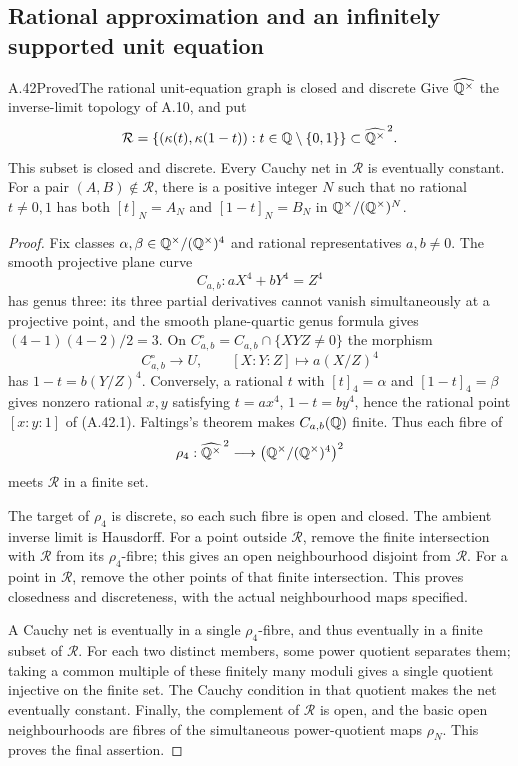 \subsection{Rational approximation and an infinitely supported unit equation}

\begin{statement}{A.42}{Proved}{The rational unit-equation graph is closed and discrete}
Give $\widehat{\mathbb Q^\times}$ the inverse-limit topology of A.10,
and put
\[
 \mathcal R=
 \{(\kappa(t),\kappa(1-t)):t\in\mathbb Q\setminus\{0,1\}\}
       \subset\widehat{\mathbb Q^\times}^{\,2}.
\]
This subset is closed and discrete. Every Cauchy net in
$\mathcal R$ is eventually constant. For a pair
$(A,B)\notin\mathcal R$, there is a positive integer $N$
such that no rational $t\ne0,1$ has both
$[t]_N=A_N$ and $[1-t]_N=B_N$ in
$\mathbb Q^\times/(\mathbb Q^\times)^N$.
\end{statement}
\begin{proof}
Fix classes $\alpha,\beta\in\mathbb Q^\times/(\mathbb Q^\times)^4$
and rational representatives $a,b\ne0$. The smooth projective
plane curve
\[
 C_{a,b}:aX^4+bY^4=Z^4
 \tag{A.42.1}
\]
has genus three: its three partial derivatives cannot vanish
simultaneously at a projective point, and the smooth
plane-quartic genus formula gives $(4-1)(4-2)/2=3$.
On $C_{a,b}^{\circ}=C_{a,b}\cap\{XYZ\ne0\}$ the morphism
\[
 C_{a,b}^{\circ}\longrightarrow U,
 \qquad [X:Y:Z]\longmapsto a(X/Z)^4
 \tag{A.42.2}
\]
has $1-t=b(Y/Z)^4$. Conversely, a rational $t$ with
$[t]_4=\alpha$ and $[1-t]_4=\beta$ gives nonzero rational
$x,y$ satisfying $t=ax^4$, $1-t=by^4$, hence the rational
point $[x:y:1]$ of (A.42.1). Faltings's theorem
\cite[Satz 7, printed p.~365]{AgentFaltings1983} makes
$C_{a,b}(\mathbb Q)$ finite. Thus each fibre of
\[
 \rho_4:\widehat{\mathbb Q^\times}^{\,2}
       \longrightarrow
       \bigl(\mathbb Q^\times/(\mathbb Q^\times)^4\bigr)^2
\]
meets $\mathcal R$ in a finite set.

The target of $\rho_4$ is discrete, so each such fibre is
open and closed. The ambient inverse limit is Hausdorff.
For a point outside $\mathcal R$, remove the finite
intersection with $\mathcal R$ from its $\rho_4$-fibre;
this gives an open neighbourhood disjoint from $\mathcal R$.
For a point in $\mathcal R$, remove the other points of
that finite intersection. This proves closedness and
discreteness, with the actual neighbourhood maps specified.

A Cauchy net is eventually in a single $\rho_4$-fibre,
and thus eventually in a finite subset of $\mathcal R$.
For each two distinct members, some power quotient separates
them; taking a common multiple of these finitely many
moduli gives a single quotient injective on the finite set.
The Cauchy condition in that quotient makes the net
eventually constant. Finally, the complement of
$\mathcal R$ is open, and the basic open neighbourhoods
are fibres of the simultaneous power-quotient maps $\rho_N$.
This proves the final assertion.
\end{proof}

